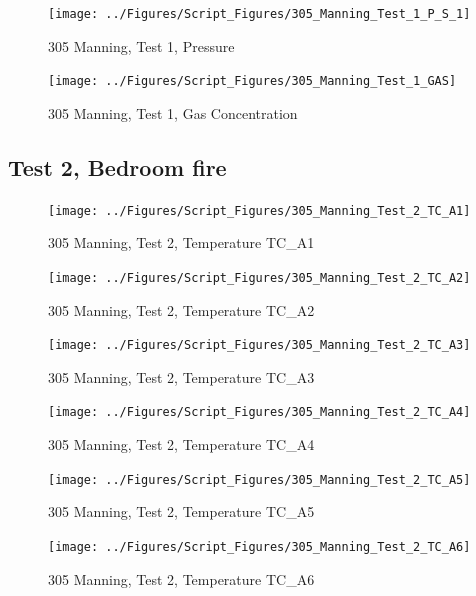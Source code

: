\documentclass[12pt,oneside]{book}
\begin{document}
\begin{figure}[!ht]
\texttt{[image: ../Figures/Script\_Figures/305\_Manning\_Test\_1\_P\_S\_1]}
\caption{305 Manning, Test 1, Pressure}
\label{fig:305_Manning_Test_1_P_S_1}
\end{figure}

\begin{figure}[!ht]
\texttt{[image: ../Figures/Script\_Figures/305\_Manning\_Test\_1\_GAS]}
\caption{305 Manning, Test 1, Gas Concentration}
\label{fig:305_Manning_Test_1_GAS}
\end{figure}


\clearpage


\subsection{Test 2, Bedroom fire}

\begin{figure}[!ht]
\texttt{[image: ../Figures/Script\_Figures/305\_Manning\_Test\_2\_TC\_A1]}
\caption{305 Manning, Test 2, Temperature TC\_A1}
\label{fig:305_Manning_Test_2_TC_A1}
\end{figure}

\begin{figure}[!ht]
\texttt{[image: ../Figures/Script\_Figures/305\_Manning\_Test\_2\_TC\_A2]}
\caption{305 Manning, Test 2, Temperature TC\_A2}
\label{fig:305_Manning_Test_2_TC_A2}
\end{figure}

\begin{figure}[!ht]
\texttt{[image: ../Figures/Script\_Figures/305\_Manning\_Test\_2\_TC\_A3]}
\caption{305 Manning, Test 2, Temperature TC\_A3}
\label{fig:305_Manning_Test_2_TC_A3}
\end{figure}

\begin{figure}[!ht]
\texttt{[image: ../Figures/Script\_Figures/305\_Manning\_Test\_2\_TC\_A4]}
\caption{305 Manning, Test 2, Temperature TC\_A4}
\label{fig:305_Manning_Test_2_TC_A4}
\end{figure}

\begin{figure}[!ht]
\texttt{[image: ../Figures/Script\_Figures/305\_Manning\_Test\_2\_TC\_A5]}
\caption{305 Manning, Test 2, Temperature TC\_A5}
\label{fig:305_Manning_Test_2_TC_A5}
\end{figure}

\begin{figure}[!ht]
\texttt{[image: ../Figures/Script\_Figures/305\_Manning\_Test\_2\_TC\_A6]}
\caption{305 Manning, Test 2, Temperature TC\_A6}
\label{fig:305_Manning_Test_2_TC_A6}
\end{figure}
\end{document}
